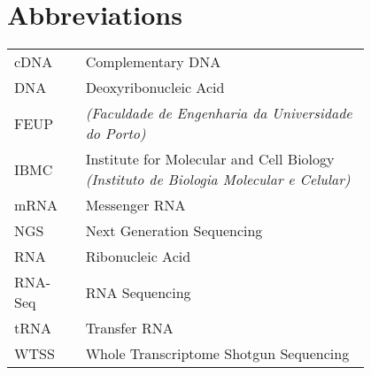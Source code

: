 \chapter*{Abbreviations}

\begin{flushleft}
\begin{tabular}{l p{0.8\linewidth}}
cDNA      & Complementary DNA\\
DNA       & Deoxyribonucleic Acid\\
FEUP      & \Feup{} \textit{(Faculdade de Engenharia da Universidade do Porto)}\\
IBMC      & Institute for Molecular and Cell Biology \textit{(Instituto de Biologia Molecular e Celular)}\\
mRNA      & Messenger RNA\\
NGS       & Next Generation Sequencing\\
RNA       & Ribonucleic Acid\\
RNA-Seq   & RNA Sequencing\\
tRNA      & Transfer RNA\\
WTSS      & Whole Transcriptome Shotgun Sequencing\\
\end{tabular}
\end{flushleft}

